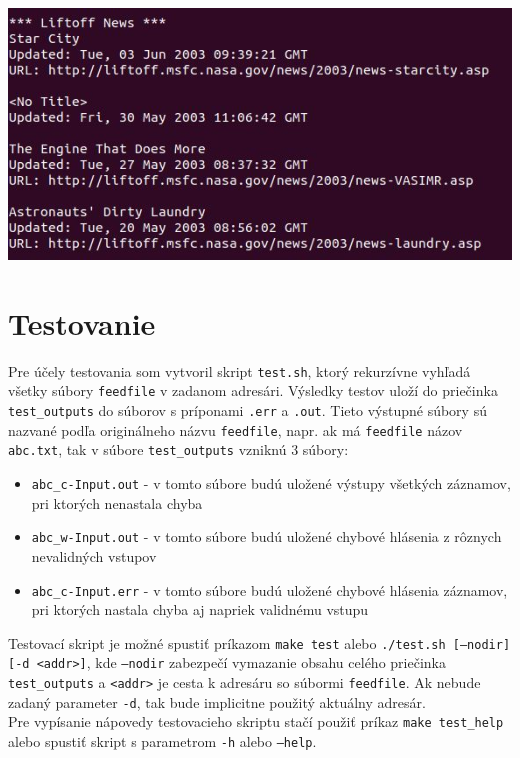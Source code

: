 \documentclass[a4paper, 11pt]{article}
\begin{document}
    \includegraphics[width=0.8\linewidth]{img/output.JPG}

    \section{Testovanie}
    Pre účely testovania som vytvoril skript \texttt{test.sh}, ktorý rekurzívne vyhľadá všetky súbory \texttt{feedfile} v zadanom adresári. Výsledky testov uloží do priečinka \texttt{test\_outputs} do súborov s príponami \texttt{.err} a \texttt{.out}. Tieto výstupné súbory sú nazvané podľa originálneho názvu \texttt{feedfile}, napr. ak má \texttt{feedfile} názov \texttt{abc.txt}, tak v súbore \texttt{test\_outputs} vzniknú 3 súbory:
    \begin{itemize}
        \item \texttt{abc\_c-Input.out} - v tomto súbore budú uložené výstupy všetkých záznamov, pri ktorých nenastala chyba
        \item \texttt{abc\_w-Input.out} - v tomto súbore budú uložené chybové hlásenia z rôznych nevalidných vstupov
        \item \texttt{abc\_c-Input.err} - v tomto súbore budú uložené chybové hlásenia záznamov, pri ktorých nastala chyba aj napriek validnému vstupu
    \end{itemize}
    
	Testovací skript je možné spustiť príkazom \texttt{make test} alebo \texttt{./test.sh [--nodir] [-d <addr>]}, kde \texttt{--nodir} zabezpečí vymazanie obsahu celého priečinka \texttt{test\_outputs} a \texttt{<addr>} je cesta k adresáru so súbormi \texttt{feedfile}. Ak nebude zadaný parameter \texttt{-d}, tak bude implicitne použitý aktuálny adresár. \\ 
	
    Pre vypísanie nápovedy testovacieho skriptu stačí použiť príkaz \texttt{make test\_help} alebo spustiť skript s parametrom \texttt{-h} alebo \texttt{--help}.    
\end{document}
